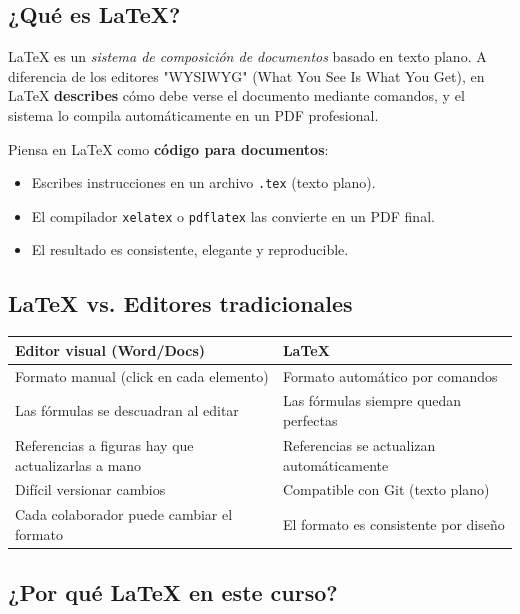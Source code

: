 \documentclass[11pt, a4paper]{article}
\begin{document}
\subsection{¿Qué es LaTeX?}

LaTeX es un \textit{sistema de composición de documentos} basado en texto plano. A diferencia de los editores "WYSIWYG" (What You See Is What You Get), en LaTeX \textbf{describes} cómo debe verse el documento mediante comandos, y el sistema lo compila automáticamente en un PDF profesional.

Piensa en LaTeX como \textbf{código para documentos}:
\begin{itemize}
    \item Escribes instrucciones en un archivo \texttt{.tex} (texto plano).
    \item El compilador \texttt{xelatex} o \texttt{pdflatex} las convierte en un PDF final.
    \item El resultado es consistente, elegante y reproducible.
\end{itemize}

\subsection{LaTeX vs. Editores tradicionales}

\begin{center}
\begin{tabular}{@{}p{6cm}p{6cm}@{}}
\toprule
\textbf{Editor visual (Word/Docs)} & \textbf{LaTeX} \\
\midrule
Formato manual (click en cada elemento) & Formato automático por comandos \\
Las fórmulas se descuadran al editar & Las fórmulas siempre quedan perfectas \\
Referencias a figuras hay que actualizarlas a mano & Referencias se actualizan automáticamente \\
Difícil versionar cambios & Compatible con Git (texto plano) \\
Cada colaborador puede cambiar el formato & El formato es consistente por diseño \\
\bottomrule
\end{tabular}
\end{center}

\subsection{¿Por qué LaTeX en este curso?}
\end{document}
